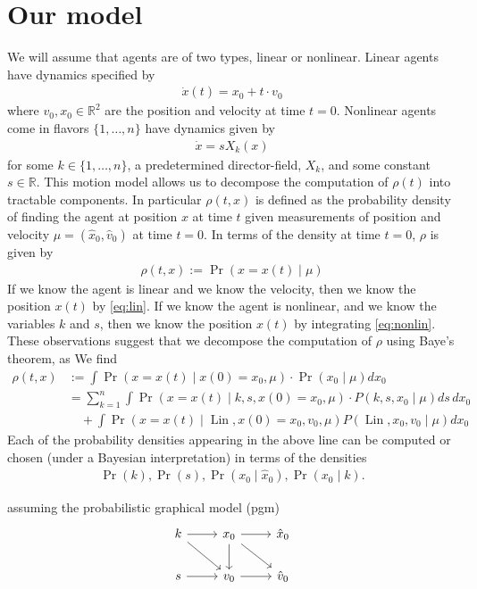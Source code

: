 \documentclass[12pt]{amsart}
\DeclareMathOperator{\Lin}{Lin}
\begin{document}
\section{Our model}
We will assume that agents are of two types, linear or nonlinear.  Linear agents have dynamics specified by
\begin{align}
	\dot{x} (t)= x_0 + t \cdot v_0 \label{eq:lin}
\end{align}
where $v_0, x_0 \in \mathbb{R}^2$ are the position and velocity at time $t=0$.
Nonlinear agents come in flavors $\{1,\dots,n\}$ have dynamics given by
\begin{align}
	\dot{x} = s X_k(x) \label{eq:nonlin}
\end{align}
for some $k \in \{1,\dots,n\}$, a predetermined director-field, $X_k$, and some constant $s \in \mathbb{R}$.
This motion model allows us to decompose the computation of $\rho(t)$ into tractable components.
In particular $\rho(t,x)$ is defined as the probability density of finding the agent at position $x$ at time $t$ given measurements of position and velocity $\mu = (\hat{x}_0, \hat{v}_0)$ at time $t=0$.
In terms of the density at time $t=0$, $\rho$ is given by
\begin{align*}
	\rho(t,x ) := \Pr( x = x(t)\mid \mu )
\end{align*}
If we know the agent is linear and we know the velocity, then we know the position $x(t)$ by \eqref{eq:lin}.
If we know the agent is nonlinear, and we know the variables $k$ and $s$, then we know the position $x(t)$ by integrating \eqref{eq:nonlin}.
These observations suggest that we decompose the computation of $\rho$ using Baye's theorem, as
We find
\begin{align*}
	\rho(t,x ) &:= \int \Pr( x = x(t) \mid x(0) = x_0, \mu ) \cdot \Pr(x_0 \mid \mu ) dx_0 \\
	&= \sum_{k=1}^{n} \int \Pr( x = x(t) \mid k,s, x(0) = x_0, \mu ) \cdot P( k,s,x_0 \mid \mu) ds \, dx_0 \\
	&\quad + \int \Pr(x = x(t) \mid \Lin, x(0) = x_0, v_0 , \mu ) P( \Lin, x_0, v_0  \mid \mu ) dx_0
\end{align*}
Each of the probability densities appearing in the above line can be computed or chosen (under a Bayesian interpretation)
in terms of the densities
\begin{align*}
	\Pr(k) , \Pr(s), \Pr( x_0 \mid \hat{x}_0 ), \Pr( x_0 \mid k ).
\end{align*}

assuming the probabilistic graphical model (pgm)
\begin{equation}
\begin{tikzcd}
	k \arrow[r] \arrow[rd] & x_0 \arrow[d] \arrow[r] \ar[dr] & \hat{x}_0 \\
	s \arrow[r] & v_0 \ar[r] & \hat{v}_0 \\
\end{tikzcd}
\label{eq:pgm}
\end{equation}
\end{document}
